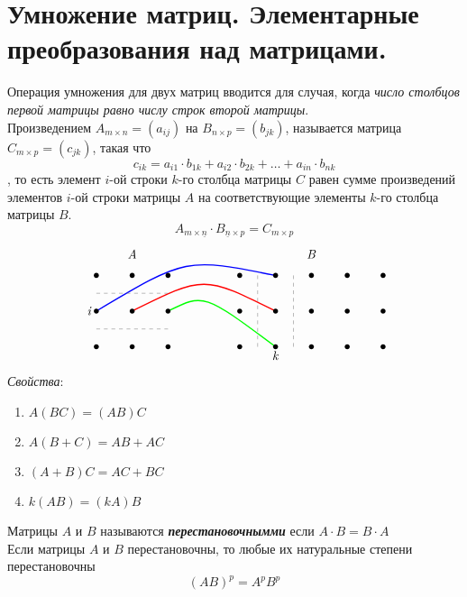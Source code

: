 \documentclass[12pt, fleqn]{article}
\begin{document}
\section{Умножение матриц. Элементарные преобразования над матрицами.}
Операция умножения для двух матриц вводится для случая, когда \textit{число столбцов первой матрицы равно числу строк второй матрицы}.\\
Произведением $A_{m\times n}=\left(a_{ij}\right)$ на $ B_{n\times p}=\left(b_{jk}\right)$, называется матрица $C_{m\times p} = \left(c_{jk}\right)$, такая что 
$$c_{ik}=a_{i1}\cdot b_{1k}+a_{i2}\cdot b_{2k}+\dots+a_{in}\cdot b_{nk}$$, то есть элемент $i$-ой строки $k$-го столбца матрицы $C$ равен сумме произведений элементов $i$-ой строки матрицы $A$ на соответствующие элементы $k$-го столбца матрицы $B$.
$$A_{m\times \underline{n}}\cdot B_{\underline{n}\times p}=C_{m\times p}$$
\begin{equation*}
	\begin{tikzpicture}
		\draw[blue, line width=1pt] (1,2) .. controls (3.5,3.5) .. (6,3);
		\draw[red, line width=1pt] (2,2) .. controls (4,3) .. (6,2);
		\draw[green, line width=1pt](3,2) .. controls (4,2.5) .. (6,1);
		\foreach \x in {1,2,3}{
			\foreach \y in {1,2,3}{
				\fill (\x, \y) circle (2pt);
			}
		}
		\foreach \x in {5,6,7,8,9}{
			\foreach \y in {1,2,3}{
				\fill (\x, \y) circle (2pt);
			}
		}
		\draw[dashed, gray] (1,1.5)--(3, 1.5);
		\draw[dashed, gray] (1,2.5)--(3, 2.5);
		\draw[dashed, gray] (5.5,1)--(5.5, 3);
		\draw[dashed, gray] (6.5,1)--(6.5, 3);
		\draw (1,2) node[anchor=east]{\textit{i}};
		\draw (6,1) node[anchor=north]{\textit{k}};
		\draw (2,3) node[above=10]{\textit{A}};
		\draw (7,3) node[above=10]{\textit{B}};
	\end{tikzpicture}
\end{equation*}
\textit{Свойства}:\\
\begin{enumerate}
	\item $A\left(B C\right)=\left(A B\right)C$
	\item $A \left( B+C\right)=A B + A C$
	\item $\left(A+B\right) C = A C + B C$
	\item $k \left(A B\right)=\left(k A\right) B$
\end{enumerate}
Матрицы $A$ и $B$ называются \textbf{\textit{перестановочнымми}} если $A\cdot B= B \cdot A$\\
Если матрицы $A$ и $B$ перестановочны, то любые их натуральные степени перестановочны\\
$$\left(AB\right)^{p}=A^pB^p$$
\end{document}
